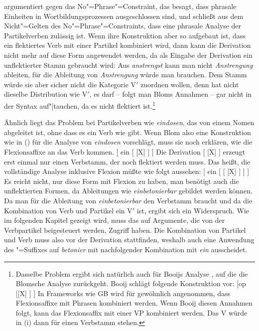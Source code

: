 \citet[]{Blom2005a} argumentiert gegen das No"=Phrase"=Constraint, das besagt,
dass phrasale Einheiten in Wortbildungsprozessen ausgeschlossen sind, und schließt aus
dem Nicht"=Gelten des No"=Phrase"=Constraints, dass eine
phrasale Analyse der Partikelverben zulässig ist. Wenn ihre Konstruktion aber so aufgebaut
ist, dass ein flektiertes Verb mit einer Partikel kombiniert wird, dann kann die Derivation
nicht mehr auf diese Form angewendet werden, da als Eingabe der Derivation ein unflektierter
Stamm gebraucht wird: Aus \emph{anstrengst} kann man nicht \emph{Anstrengung} ableiten,
für die Ableitung von \emph{Anstrengung} würde man  brauchen.
Dem Stamm  würde sie aber sicher nicht die Kategorie V$'$ zuordnen wollen,
denn  hat nicht dieselbe Distribution wie V$'$, es darf -- folgt man
Bloms Annahmen -- gar nicht in der Syntax auf"|tauchen, da es nicht flektiert ist.\footnote{
  Dasselbe Problem ergibt sich natürlich auch für Booijs Analyse \citeyearpar[]{Booij2002a},
  auf die die Blomsche Analyse zurückgeht. Booij schlägt folgende Konstruktion vor:
\ea
{}[op [[X] ] ]
\z
In Frameworks wie GB
wird für gewöhnlich angenommen, dass Flexionsaffixe mit Phrasen kombiniert werden.
Wenn Booij diesen Annahmen folgt, kann das Flexionsaffix mit einer VP kombiniert werden. Das V
würde in (i) dann für einen Verbstamm stehen.%
}

Ähnlich liegt das Problem bei Partikelverben wie \emph{eindosen}, das von einem Nomen abgeleitet
ist, ohne dass es ein Verb wie  gibt. Wenn
Blom also eine Konstruktion wie in () für die Analyse von \emph{eindosen}
vorschlägt, muss sie noch erklären, wie die Flexionsaffixe an das Verb kommen.
\ea
{}[ ein   [ [X] ] ]
\z
Die Derivation [ [X] ] erzeugt erst einmal nur einen Verbstamm, der noch
flektiert werden muss. Das heißt, die vollständige Analyse inklusive Flexion müßte
wie folgt aussehen:
\ea
{}[ ein   [ [ [X] ] ] ]
\z
Es reicht nicht, nur diese Form mit Flexion zu haben, man benötigt auch
die unflektierten Formen, da Ableitungen wie \emph{einbetonierbar} gebildet
werden können. 
Da man für die Ableitung von \emph{einbetonierbar} den Verbstamm  braucht und da
die Kombination von Verb und Partikel ein V$'$ ist, ergibt sich ein Widerspruch. Wie im folgenden
Kapitel gezeigt wird, muss das \bars auf Argumente, die von der Verbpartikel beigesteuert werden,
Zugriff haben. Die Kombination von Partikel und Verb muss also vor der Derivation stattfinden,
weshalb auch eine Anwendung des \bars"=Suffixes auf \emph{betonier} mit nachfolgender Kombination mit
\emph{ein} ausscheidet.

